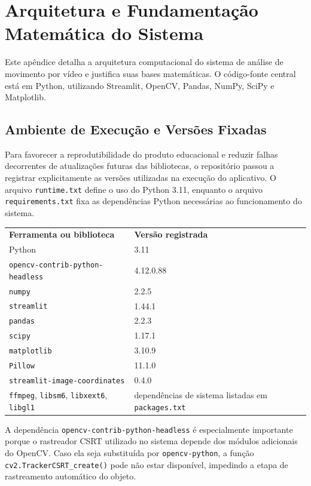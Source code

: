 \chapter{Arquitetura e Fundamentação Matemática do Sistema}

Este apêndice detalha a arquitetura computacional do sistema de análise de movimento por vídeo e justifica suas bases matemáticas. O código-fonte central está em Python, utilizando Streamlit, OpenCV, Pandas, NumPy, SciPy e Matplotlib.

\section{Ambiente de Execução e Versões Fixadas}

Para favorecer a reprodutibilidade do produto educacional e reduzir falhas decorrentes de atualizações futuras das bibliotecas, o repositório passou a registrar explicitamente as versões utilizadas na execução do aplicativo. O arquivo \texttt{runtime.txt} define o uso do Python 3.11, enquanto o arquivo \texttt{requirements.txt} fixa as dependências Python necessárias ao funcionamento do sistema.

\begin{center}
\begin{tabular}{p{}p{}}
\textbf{Ferramenta ou biblioteca} & \textbf{Versão registrada} \\
Python & 3.11 \\
\texttt{opencv-contrib-python-headless} & 4.12.0.88 \\
\texttt{numpy} & 2.2.5 \\
\texttt{streamlit} & 1.44.1 \\
\texttt{pandas} & 2.2.3 \\
\texttt{scipy} & 1.17.1 \\
\texttt{matplotlib} & 3.10.9 \\
\texttt{Pillow} & 11.1.0 \\
\texttt{streamlit-image-coordinates} & 0.4.0 \\
\texttt{ffmpeg}, \texttt{libsm6}, \texttt{libxext6}, \texttt{libgl1} & dependências de sistema listadas em \texttt{packages.txt} \\
\end{tabular}
\end{center}

A dependência \texttt{opencv-contrib-python-headless} é especialmente importante porque o rastreador CSRT utilizado no sistema depende dos módulos adicionais do OpenCV. Caso ela seja substituída por \texttt{opencv-python}, a função \texttt{cv2.TrackerCSRT\_create()} pode não estar disponível, impedindo a etapa de rastreamento automático do objeto.

